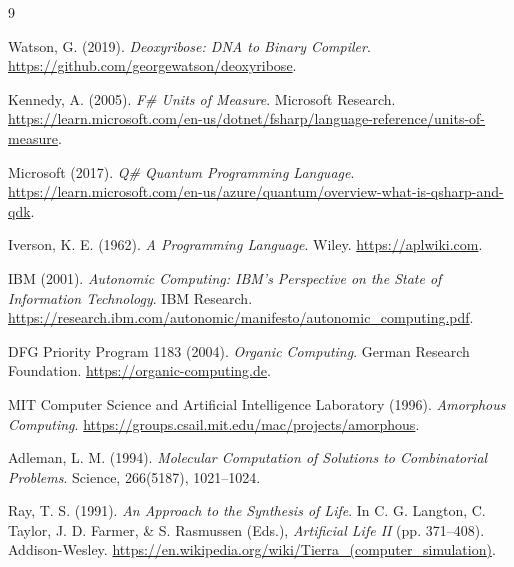 \documentclass[11pt,a4paper]{article}
\begin{document}
\begin{thebibliography}{9}

Watson, G. (2019).
\textit{Deoxyribose: DNA to Binary Compiler}.
\url{https://github.com/georgewatson/deoxyribose}.

Kennedy, A. (2005).
\textit{F\# Units of Measure}.
Microsoft Research.
\url{https://learn.microsoft.com/en-us/dotnet/fsharp/language-reference/units-of-measure}.

Microsoft (2017).
\textit{Q\# Quantum Programming Language}.
\url{https://learn.microsoft.com/en-us/azure/quantum/overview-what-is-qsharp-and-qdk}.

Iverson, K. E. (1962).
\textit{A Programming Language}.
Wiley.
\url{https://aplwiki.com}.

IBM (2001).
\textit{Autonomic Computing: IBM's Perspective on the State of Information Technology}.
IBM Research.
\url{https://research.ibm.com/autonomic/manifesto/autonomic_computing.pdf}.

DFG Priority Program 1183 (2004).
\textit{Organic Computing}.
German Research Foundation.
\url{https://organic-computing.de}.

MIT Computer Science and Artificial Intelligence Laboratory (1996).
\textit{Amorphous Computing}.
\url{https://groups.csail.mit.edu/mac/projects/amorphous}.

Adleman, L. M. (1994).
\textit{Molecular Computation of Solutions to Combinatorial Problems}.
Science, 266(5187), 1021--1024.

Ray, T. S. (1991).
\textit{An Approach to the Synthesis of Life}.
In C. G. Langton, C. Taylor, J. D. Farmer, \& S. Rasmussen (Eds.),
\textit{Artificial Life II} (pp. 371--408). Addison-Wesley.
\url{https://en.wikipedia.org/wiki/Tierra_(computer_simulation)}.

\end{thebibliography}
\end{document}
